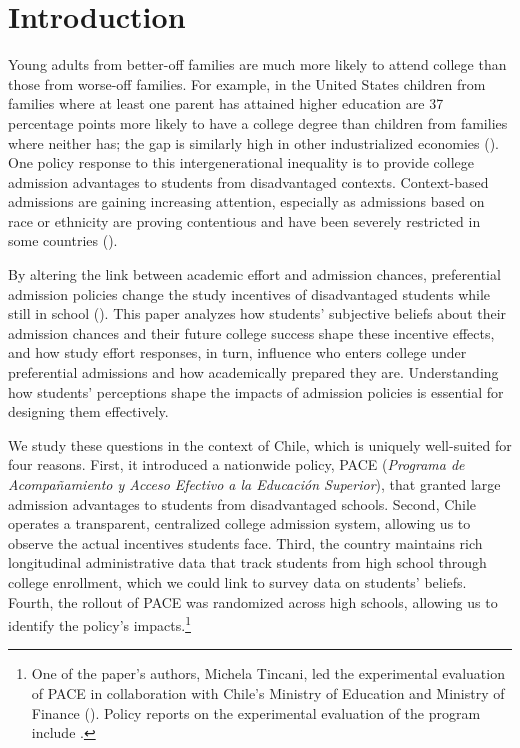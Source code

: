 \section{Introduction}
Young adults from better-off families are much more likely to attend college than those from worse-off families. For example, in the United States children from families where at least one parent has attained higher education are 37 percentage points more likely to have a college degree than children from families where neither has; the gap is similarly high in other industrialized economies (\citealp{oecd2024eagdata}). One policy response to this intergenerational inequality is to provide college admission advantages to students from disadvantaged contexts. Context-based admissions are gaining increasing attention, especially as admissions based on race or ethnicity are proving contentious and have been severely restricted in some countries (\citealp{arcidiacono2016affirmative,feingold2023affirmative}). \par 



By altering the link between academic effort and admission chances, preferential admission policies change the study incentives of disadvantaged students while still in school (\citealp{coate1993will}). This paper analyzes how students’ subjective beliefs about their admission chances and their future college success shape these incentive effects, and how study effort responses, in turn, influence who enters college under preferential admissions and how academically prepared they are. Understanding how students' perceptions shape the impacts of admission policies is essential for designing them effectively.\par 





We study these questions in the context of Chile, which is uniquely well-suited for four reasons. First, it introduced a nationwide policy, PACE ({\itshape Programa de Acompañamiento y Acceso Efectivo a la Educación Superior}), that granted large admission advantages to students from disadvantaged schools. Second, Chile operates a transparent, centralized college admission system, allowing us to observe the actual incentives students face. Third, the country maintains rich longitudinal administrative data that track students from high school through college enrollment, which we could link to survey data on students’ beliefs. Fourth, the rollout of PACE was randomized across high schools, allowing us to identify the policy's impacts.\footnote{One of the paper’s authors, Michela Tincani, led the experimental evaluation of PACE in collaboration with Chile’s Ministry of Education and Ministry of Finance (\citealp{dipres2022experimental}). Policy reports on the experimental evaluation of the program include \citealp*{evaluacion_mineduc_2019,evaluacion_mineduc_2020,evaluacion_mineduc_2022}.}\par 




